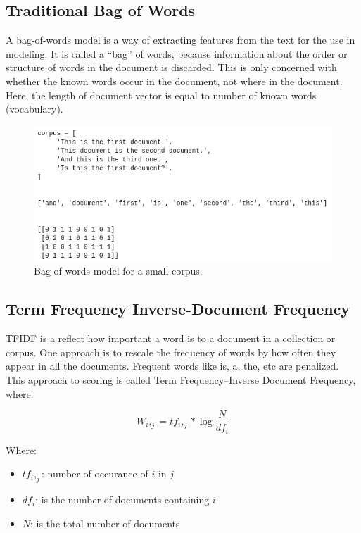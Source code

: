 \subsection{Traditional Bag of Words}
A bag-of-words model is a way of extracting features from the text for the use in modeling. It is called a “bag” of words, because information about the order or structure of words in the document is discarded. This is only concerned with whether the known words occur in the document, not where in the document. Here, the length of document vector is equal to number of known words (vocabulary). 

\begin{figure}[tbh]
\begin{center}
	\includegraphics[width=5.5in]{images/bagofwords.png}
	\caption{Bag of words model for a small corpus.}
	\label{some_tfidf}
\end{center}
\end{figure}

\newpage

\subsection{Term Frequency Inverse-Document Frequency}
\ac{TFIDF} \cite{Ramos_usingtf-idf} is a reflect how important a word is to a document in a collection or corpus. One approach is to rescale the frequency of words by how often they appear in all the documents. Frequent words like is, a, the, etc are penalized. This approach to scoring is called Term Frequency–Inverse Document Frequency, where: 

\[W_i,_j = tf_i,_j * \log\frac{N}{df_i}\]

Where:
\begin{itemize}
    \item $tf_{i},_{j}$: number of occurance of $i$ in $j$
    \item $df_{i}$: is the number of documents containing $i$
    \item $N$: is the total number of documents
\end{itemize}


